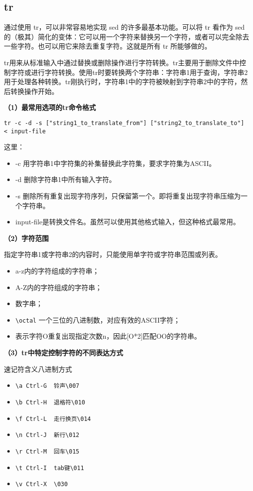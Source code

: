 \subsection{tr}
通过使用 tr，可以非常容易地实现 sed 的许多最基本功能。可以将 tr 看作为 sed 的（极其）简化的变体：它可以用一个字符来替换另一个字符，或者可以完全除去一些字符。也可以用它来除去重复字符。这就是所有 tr 所能够做的。 


tr用来从标准输入中通过替换或删除操作进行字符转换。tr主要用于删除文件中控制字符或进行字符转换。使用tr时要转换两个字符串：字符串1用于查询，字符串2用于处理各种转换。tr刚执行时，字符串1中的字符被映射到字符串2中的字符，然后转换操作开始。

\textbf{（1）最常用选项的tr命令格式}

\verb|tr -c -d -s ["string1_to_translate_from"] ["string2_to_translate_to"] < input-file|

这里：
\begin{itemize}
\item -c 用字符串1中字符集的补集替换此字符集，要求字符集为ASCII。
\item -d 删除字符串1中所有输入字符。
\item -s 删除所有重复出现字符序列，只保留第一个。即将重复出现字符串压缩为一个字符串。
\item input-file是转换文件名。虽然可以使用其他格式输入，但这种格式最常用。
\end{itemize}

\textbf{（2）字符范围}

指定字符串1或字符串2的内容时，只能使用单字符或字符串范围或列表。
\begin{itemize}
\item [a-z] a-z内的字符组成的字符串；
\item [A-Z] A-Z内的字符组成的字符串；
\item [0-9] 数字串；
\item \verb|\octal| 一个三位的八进制数，对应有效的ASCII字符；
\item [O*n] 表示字符O重复出现指定次数n，因此[O*2]匹配OO的字符串。
\end{itemize}

\textbf{（3）tr中特定控制字符的不同表达方式}

速记符含义八进制方式
\begin{itemize}
\item \verb|\a Ctrl-G  铃声\007|
\item \verb|\b Ctrl-H  退格符\010|
\item \verb|\f Ctrl-L  走行换页\014|
\item \verb|\n Ctrl-J  新行\012|
\item \verb|\r Ctrl-M  回车\015|
\item \verb|\t Ctrl-I  tab键\011|
\item \verb|\v Ctrl-X  \030|
\end{itemize}


